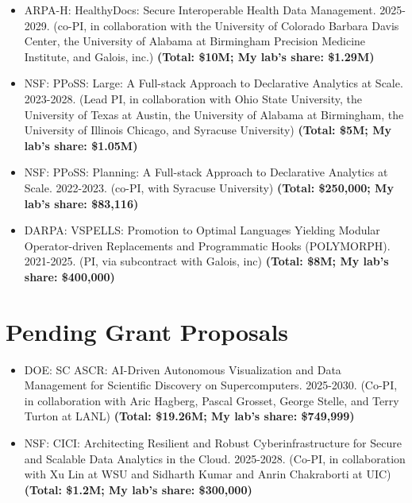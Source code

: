 \documentclass[line]{res}
\begin{document}
\begin{resume}
\begin{itemize}
  \item
    ARPA-H: HealthyDocs: Secure Interoperable Health Data Management. 2025-2029. (co-PI, in collaboration with
    the University of Colorado Barbara Davis Center, the University of Alabama at Birmingham Precision Medicine Institute, and Galois, inc.) \textbf{(Total: \$10M; My lab's share: \$1.29M)} 
  \item
    NSF: PPoSS: Large: A Full-stack Approach to Declarative Analytics at Scale. 2023-2028. (Lead PI, in collaboration with
    Ohio State University, the University of Texas at Austin, the University of Alabama at Birmingham, the University of Illinois Chicago, and Syracuse University) \textbf{(Total: \$5M; My lab's share: \$1.05M)} 
  \item
  NSF: PPoSS: Planning: A Full-stack Approach to Declarative Analytics at Scale. 2022-2023. (co-PI, with Syracuse University) \textbf{(Total: \$250,000; My lab's share: \$83,116)} 
  \item
  DARPA: VSPELLS: Promotion to Optimal Languages Yielding Modular Operator-driven Replacements and Programmatic Hooks (POLYMORPH). 2021-2025. (PI, via subcontract with Galois, inc) \textbf{(Total: \$8M; My lab's share: \$400,000)}
\end{itemize}

\section{\large Pending Grant Proposals} \vspace{0.45cm}

\begin{itemize}
\item DOE: SC ASCR: AI-Driven Autonomous Visualization and Data Management for Scientific Discovery on Supercomputers. 2025-2030. (Co-PI, in collaboration with Aric Hagberg, Pascal Grosset, George Stelle, and Terry Turton at LANL) \textbf{(Total: \$19.26M; My lab's share: \$749,999)}
\item NSF: CICI: Architecting Resilient and Robust Cyberinfrastructure for Secure and Scalable Data Analytics in the Cloud. 2025-2028. (Co-PI, in collaboration with Xu Lin at WSU and Sidharth Kumar and Anrin Chakraborti at UIC) \textbf{(Total: \$1.2M; My lab's share: \$300,000)}
\end{itemize}


\end{resume}
\end{document}
